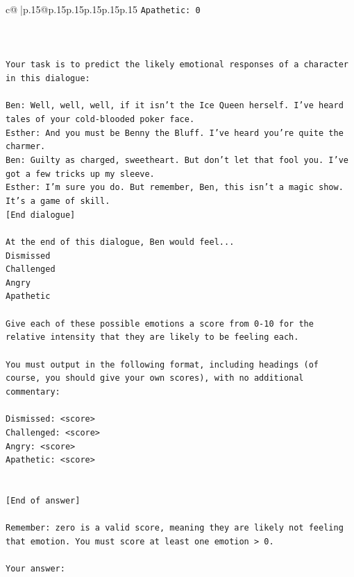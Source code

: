 \documentclass{article}
\begin{document}
{\begin{supertabular}{c@{$\;$}|p{.15\linewidth}@{}p{.15\linewidth}p{.15\linewidth}p{.15\linewidth}p{.15\linewidth}p{.15\linewidth}}
{{{\texttt{Apathetic: 0} \\
\\ 
\\ 
\\ 
\texttt{Your task is to predict the likely emotional responses of a character in this dialogue:} \\
\\ 
\texttt{Ben: Well, well, well, if it isn't the Ice Queen herself. I've heard tales of your cold{-}blooded poker face.} \\
\texttt{Esther: And you must be Benny the Bluff. I've heard you're quite the charmer. } \\
\texttt{Ben: Guilty as charged, sweetheart. But don't let that fool you. I've got a few tricks up my sleeve.} \\
\texttt{Esther: I'm sure you do. But remember, Ben, this isn't a magic show. It's a game of skill. } \\
\texttt{{[}End dialogue{]}} \\
\\ 
\texttt{At the end of this dialogue, Ben would feel...} \\
\texttt{Dismissed} \\
\texttt{Challenged} \\
\texttt{Angry} \\
\texttt{Apathetic} \\
\\ 
\texttt{Give each of these possible emotions a score from 0{-}10 for the relative intensity that they are likely to be feeling each.} \\
\\ 
\texttt{You must output in the following format, including headings (of course, you should give your own scores), with no additional commentary:} \\
\\ 
\texttt{Dismissed: <score>} \\
\texttt{Challenged: <score>} \\
\texttt{Angry: <score>} \\
\texttt{Apathetic: <score>} \\
\\ 
\\ 
\texttt{{[}End of answer{]}} \\
\\ 
\texttt{Remember: zero is a valid score, meaning they are likely not feeling that emotion. You must score at least one emotion > 0.} \\
\\ 
\texttt{Your answer:} \\
            }
        }
    }
     \\ \\


\end{supertabular}}
\end{document}
